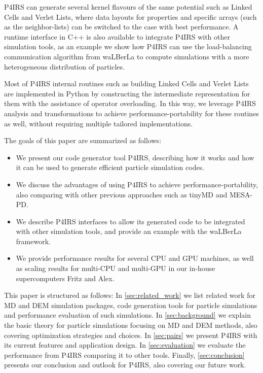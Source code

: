 \documentclass[preprint,12pt]{elsarticle}
\begin{document}
P4IRS can generate several kernel flavours of the same potential such as Linked Cells and Verlet Lists, where data layouts for properties and specific arrays (such as the neighbor-lists) can be switched to the case with best performance.
A runtime interface in C++ is also available to integrate P4IRS with other simulation tools, as an example we show how P4IRS can use the load-balancing communication algorithm from waLBerLa to compute simulations with a more heterogeneous distribution of particles.

Most of P4IRS internal routines such as building Linked Cells and Verlet Lists are implemented in Python by constructing the intermediate representation for them with the assistance of operator overloading.
In this way, we leverage P4IRS analysis and transformations to achieve performance-portability for these routines as well, without requiring multiple tailored implementations.

The goals of this paper are summarized as follows:
\begin{itemize}
	\item We present our code generator tool P4IRS, describing how it works and how it can be used to generate efficient particle simulation codes.
	\item We discuss the advantages of using P4IRS to achieve performance-portability, also comparing with other previous approaches such as tinyMD and MESA-PD.
	\item We describe P4IRS interfaces to allow its generated code to be integrated with other simulation tools, and provide an example with the waLBerLa framework.
	\item We provide performance results for several CPU and GPU machines, as well as scaling results for multi-CPU and multi-GPU in our in-house supercomputers Fritz and Alex.
\end{itemize}

This paper is structured as follows: In \autoref{sec:related_work} we list related work for MD and DEM simulation packages, code generation tools for particle simulations and performance evaluation of such simulations. In \autoref{sec:background} we explain the basic theory for particle simulations focusing on MD and DEM methods, also covering optimization strategies and choices. In \autoref{sec:pairs} we present P4IRS with its current features and application design. In \autoref{sec:evaluation} we evaluate the performance from P4IRS comparing it to other tools. Finally, \autoref{sec:conclusion} presents our conclusion and outlook for P4IRS, also covering our future work.
\end{document}
